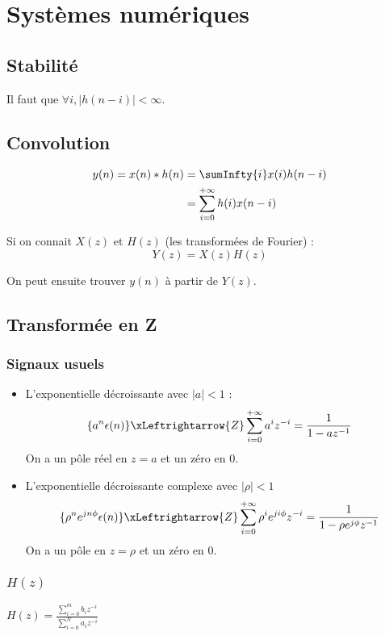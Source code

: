 \section{Systèmes numériques}
    \subsection{Stabilité}
        Il faut que $\forall i, |h(n-i)| < \infty$.

    \subsection{Convolution}\label{subsec:convolution}
        \begin{align*}
            y(n) = x(n) * h(n) &= \sumInfty{i} x(i) h(n-i)\\
                               &= \sum_{i=0}^{+\infty} h(i) x(n-i) 
        \end{align*}

        Si on connait $X(z)$ et $H(z)$ (les transformées de Fourier) :
        $$
            Y(z) = X(z)H(z)
        $$

        On peut ensuite trouver $y(n)$ à partir de $Y(z)$.

    \subsection{Transformée en Z}
        \subsubsection{Signaux usuels}
            \begin{itemize}
                \item L'exponentielle décroissante avec $|a| < 1$ :
                $$\{a^n \epsilon(n)\} \xLeftrightarrow{Z} \sum_{i=0}^{+\infty} a^i z^{-i} = \frac{1}{1 - az^{-1}}$$
                On a un pôle réel en $z = a$ et un zéro en $0$.
                \item L'exponentielle décroissante complexe avec $|\rho| < 1$
                $$\{\rho^n e^{jn\phi} \epsilon(n)\} \xLeftrightarrow{Z} \sum_{i=0}^{+\infty} \rho^i e^{ji\phi} z^{-i} = \frac{1}{1-\rho e^{j\phi} z^{-1}}$$
                On a un pôle en $z = \rho$ et un zéro en $0$.
            \end{itemize}

        \subsubsection{$H(z)$}
            $H(z) = \frac{\sum\limits_{i=0}^m b_iz^{-i}}{\sum\limits_{i=0}^N a_iz^{-i}}$
